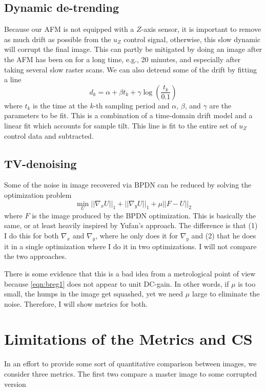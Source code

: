 \documentclass[11pt]{article}
\begin{document}
\subsection{Dynamic de-trending}
Because our AFM is not equipped with a $Z$-axis sensor, it is important to remove as much drift as possible from the $u_Z$ control signal, otherwise, this slow dynamic will corrupt the final image. This can partly be mitigated by doing an image after the AFM has been on for a long time, e.g., 20 minutes, and especially after taking several slow raster scans. We can also detrend some of the drift by fitting a line
\begin{equation}
  d_k = \alpha + \beta t_k + \gamma \log\left(\frac{t_k}{0.1}\right)
\end{equation}
where $t_k$ is the time at the $k$-th sampling period and $\alpha$, $\beta$, and $\gamma$ are the parameters to be fit. This is a combination of a time-domain drift model \cite{Jung_open_loop_2000} and a linear fit which accounts for sample tilt. This line is fit to the entire set of $u_Z$ control data and subtracted.


\subsection{ TV-denoising}
Some of the noise in image recovered via BPDN can be reduced by solving the optimization problem
\begin{equation}
  \min_{U} ||\nabla_xU||_1 + ||\nabla_yU||_1 + \mu||F - U||_2 \label{eqn:breg1}
\end{equation}
where $F$ is the image produced by the BPDN optimization. 
This is basically the same, or at least heavily inspired by Yufan's approach. The difference is that (1) I do this for both $\nabla_x$ and $\nabla_y$, where he only does it for $\nabla_y$ and (2) that he does it in a single optimization where I do it in two optimizations. I will not compare the two approaches.

There is some evidence that this is a bad idea from a metrological point of view because \eqref{eqn:breg1} does not appear to unit DC-gain. In other words, if $\mu$ is too small, the humps in the image get squashed, yet we need $\mu$ large to eliminate the noise. Therefore, I will show metrics for both.

\section{Limitations of the Metrics and CS}
In an effort to provide some sort of quantitative comparison between images, we consider three metrics. The first two compare a master image to some corrupted version
\end{document}
